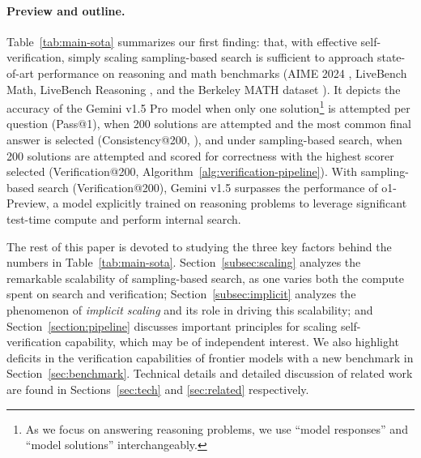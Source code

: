 \paragraph{Preview and outline.}
Table~\ref{tab:main-sota} summarizes our first finding: that, with effective self-verification, simply scaling sampling-based search is sufficient to approach state-of-art performance on reasoning and math benchmarks (AIME 2024 \citep{aime2024}, LiveBench Math, LiveBench Reasoning \citep{white2024livebenchchallengingcontaminationfreellm}, and the Berkeley MATH dataset \citep{DBLP:conf/nips/HendrycksBKABTS21}).
It depicts the accuracy of the Gemini v1.5 Pro model \citep{geminiteam2024gemini15unlockingmultimodal} when only one solution\footnote{As we focus on answering reasoning problems, we use ``model responses'' and ``model solutions'' interchangeably.} is attempted per question (Pass@1), when 200 solutions are attempted and the most common final answer is selected (Consistency@200, \cite{DBLP:conf/iclr/0002WSLCNCZ23}), and under sampling-based search, when 200 solutions are attempted and scored for correctness with the highest scorer selected (Verification@200, Algorithm~\ref{alg:verification-pipeline}).
With sampling-based search (Verification@200), Gemini v1.5 surpasses the performance of o1-Preview, a model explicitly trained on reasoning problems to leverage significant test-time compute and perform internal search.

The rest of this paper is devoted to studying the three key factors behind the numbers in Table~\ref{tab:main-sota}.
Section~\ref{subsec:scaling} analyzes the remarkable scalability of sampling-based search, as one varies both the compute spent on search and verification;
Section~\ref{subsec:implicit} analyzes the phenomenon of \emph{implicit scaling} and its role in driving this scalability; and
Section~\ref{section:pipeline} discusses  important principles for scaling self-verification capability, which may be of independent interest.
We also highlight deficits in the verification capabilities of frontier models with a new benchmark in Section~\ref{sec:benchmark}.
Technical details and detailed discussion of related work are found in Sections~\ref{sec:tech} and \ref{sec:related} respectively.




